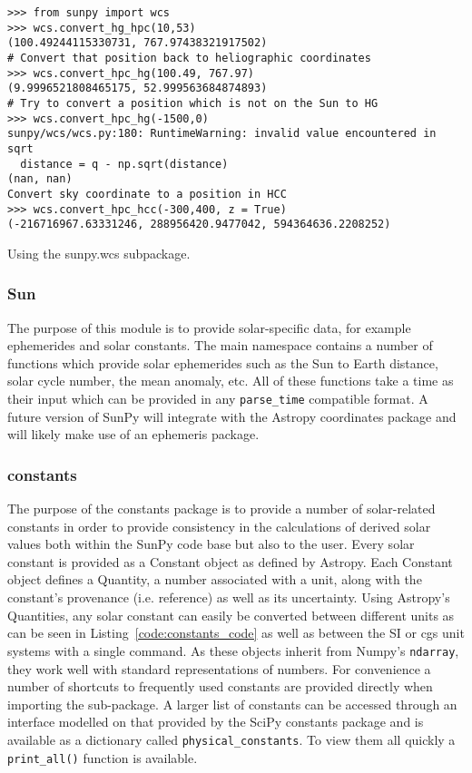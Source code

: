 \begin{listing}[H]
\begin{verbatim}
>>> from sunpy import wcs
>>> wcs.convert_hg_hpc(10,53)
(100.49244115330731, 767.97438321917502)
# Convert that position back to heliographic coordinates
>>> wcs.convert_hpc_hg(100.49, 767.97)
(9.9996521808465175, 52.999563684874893)
# Try to convert a position which is not on the Sun to HG
>>> wcs.convert_hpc_hg(-1500,0)
sunpy/wcs/wcs.py:180: RuntimeWarning: invalid value encountered in sqrt
  distance = q - np.sqrt(distance)
(nan, nan)
Convert sky coordinate to a position in HCC
>>> wcs.convert_hpc_hcc(-300,400, z = True)
(-216716967.63331246, 288956420.9477042, 594364636.2208252)
\end{verbatim}
\caption{Using the sunpy.wcs subpackage.}
\label{code:wcs_code}
\end{listing}

\subsubsection{Sun}\label{ssec:util:sun}
The purpose of this module is to provide solar-specific data, for example ephemerides and
solar constants. The main namespace contains a number of functions which provide solar
ephemerides such as the Sun to Earth distance, solar cycle number, the mean 
anomaly, etc.
All of these functions take a time as their input which can be provided in any 
\texttt{parse\_time}
compatible format. 
A future version of SunPy will integrate with the Astropy coordinates package and will 
likely make use of an ephemeris package.

\subsubsection{constants}\label{ssec:util:const}
The purpose of the constants package is to provide a number of solar-related 
constants in order to provide consistency in the calculations of derived solar 
values both within the SunPy code base but also to the user. Every solar 
constant is provided as a Constant object as defined by Astropy. Each 
Constant object defines a Quantity, a number associated with a unit, along with 
the constant's provenance (i.e. reference) as well as its uncertainty. Using 
Astropy's Quantities, any solar constant can easily be converted between 
different units as can be seen in Listing~\ref{code:constants_code} as well
as between the SI or cgs unit systems with a single command.  As these objects inherit from 
Numpy's \texttt{ndarray}, they work well with standard representations of numbers.
For convenience a number of shortcuts to frequently used constants are provided 
directly when importing the sub-package. A larger list of constants can be 
accessed through an interface modelled on that provided by the SciPy constants 
package and is available as a dictionary called \texttt{physical\_constants}. 
To view them all quickly a \texttt{print\_all()} function is available.


